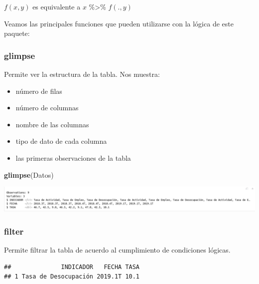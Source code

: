 \documentclass[]{book}
\newenvironment{Shaded}{\begin{snugshade}}{\end{snugshade}}
\newcommand{\DecValTok}[1]{\textcolor[rgb]{0.00,0.00,0.81}{#1}}
\newcommand{\KeywordTok}[1]{\textcolor[rgb]{0.13,0.29,0.53}{\textbf{#1}}}
\newcommand{\NormalTok}[1]{#1}
\newcommand{\OperatorTok}[1]{\textcolor[rgb]{0.81,0.36,0.00}{\textbf{#1}}}
\newcommand{\StringTok}[1]{\textcolor[rgb]{0.31,0.60,0.02}{#1}}
\providecommand{\tightlist}{%
  \setlength{\itemsep}{0pt}\setlength{\parskip}{0pt}}
\begin{document}
\(f(x,y)\) es equivalente a \(x\) \%\textgreater{}\% \(f(.,y)\)

Veamos las principales funciones que pueden utilizarse con la lógica de este paquete:

\hypertarget{glimpse}{%
\subsubsection{glimpse}\label{glimpse}}

Permite ver la estructura de la tabla. Nos muestra:

\begin{itemize}
\tightlist
\item
  número de filas
\item
  número de columnas
\item
  nombre de las columnas
\item
  tipo de dato de cada columna
\item
  las primeras observaciones de la tabla
\end{itemize}

\begin{Shaded}
\begin{Highlighting}[]
\KeywordTok{glimpse}\NormalTok{(Datos)}
\end{Highlighting}
\end{Shaded}

\includegraphics{img/glimpse.png}

\hypertarget{filter}{%
\subsubsection{filter}\label{filter}}

Permite filtrar la tabla de acuerdo al cumplimiento de condiciones lógicas.

\begin{Shaded}
\end{Shaded}

\begin{verbatim}
##              INDICADOR   FECHA TASA
## 1 Tasa de Desocupación 2019.1T 10.1
\end{verbatim}
\end{document}
